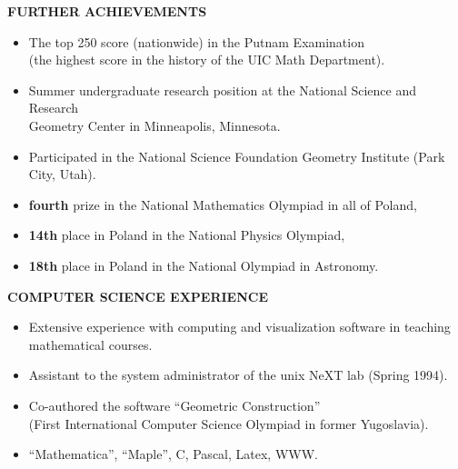  \hspace{-.29in} {\bf FURTHER ACHIEVEMENTS}
\vspace{-.09in}
\begin{itemize}

\item  The top 250 score (nationwide) in the Putnam Examination  \vspace{-.032in} \\ 
                     (the highest score in the history of the UIC Math Department).
              
\item \vspace{-0.08in} Summer  undergraduate  research position  at   the 
                     National Science  and   
                     Research \vspace{-.032in}  \\  Geometry Center in Minneapolis, Minnesota. 

 \item  \vspace{ -.09in}      Participated in the National Science Foundation Geometry Institute (Park City, Utah).


         \item \vspace{ -.09in} {\bf fourth} prize in the National Mathematics Olympiad  in all of   
                Poland,
         \item \vspace{ -.09in} {\bf 14th} place in Poland in the National Physics Olympiad,
         \item \vspace{ -.09in} {\bf 18th} place in Poland in the National Olympiad in Astronomy.
             
 

\end{itemize}


\vspace{.12in}
\hspace{-.29in} {\bf  COMPUTER SCIENCE EXPERIENCE}
\begin{itemize}
\vspace{-0.09in}
\item Extensive experience with computing and visualization software in teaching mathematical courses.

\vspace{-0.09in}
\item Assistant to the system administrator of the unix NeXT lab (Spring 1994).


\vspace{-.09in} \item Co-authored the software ``Geometric Construction''\\ \vspace{-.032in}  (First International Computer Science Olympiad in former Yugoslavia). 
\vspace{-.09in}
\item  ``Mathematica'', ``Maple'', C, Pascal, Latex, WWW.
\end {itemize}


